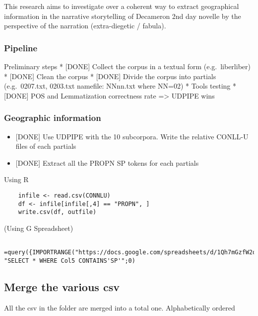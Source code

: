 This research aims to investigate over a coherent way to extract
geographical information in the narrative storytelling of Decameron 2nd
day novelle by the perspective of the narration (extra-diegetic /
fabula).

\subsubsection{Pipeline}\label{pipeline}

Preliminary steps * {[}DONE{]} Collect the corpus in a textual form
(e.g.~liberliber) * {[}DONE{]} Clean the corpus * {[}DONE{]} Divide the
corpus into partials (e.g.~0207.txt, 0203.txt \textbar{} namefile:
NNnn.txt where NN=02) * Tools testing * {[}DONE{]} POS and Lemmatization
correctness rate =\textgreater{} UDPIPE wins

\subsubsection{Geographic information}\label{geographic-information}

\begin{itemize}
\tightlist
\item
  {[}DONE{]} Use UDPIPE with the 10 subcorpora. Write the relative
  CONLL-U files of each partials
\item
  {[}DONE{]} Extract all the PROPN \textbar{} SP tokens for each
  partials
\end{itemize}

Using R

\begin{verbatim}
    infile <- read.csv(CONNLU)
    df <- infile[infile[,4] == "PROPN", ]
    write.csv(df, outfile)
\end{verbatim}

(Using G Spreadsheet)

\begin{verbatim}
    =query({IMPORTRANGE("https://docs.google.com/spreadsheets/d/1Qh7mGzfW2ow8RzOniqO_-60JST6pbT71dfzaz_GtV0k";"prova!A1:J15000")}; "SELECT * WHERE Col5 CONTAINS'SP'";0)
\end{verbatim}

\subsection{Merge the various csv}\label{merge-the-various-csv}

All the csv in the folder are merged into a total one. Alphabetically
ordered

